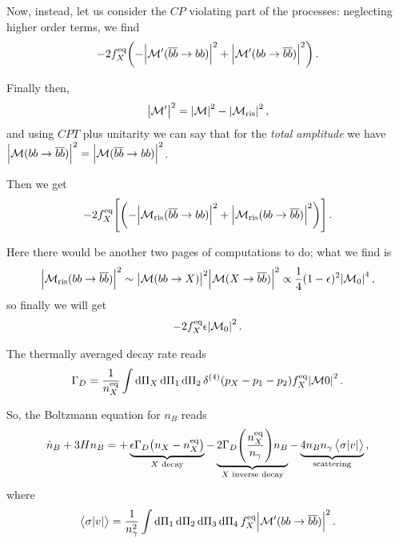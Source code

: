 \documentclass[main.tex]{subfiles}
\begin{document}
Now, instead, let us consider the \(CP\) violating part of the processes: neglecting higher order terms, we find 
%
\begin{align}
- 2 f_X^{\text{eq}} \qty(- \abs{\mathcal{M}'(\overline{b} \overline{b} \to bb)}^2 + \abs{\mathcal{M}' (bb \to \overline{b} \overline{b})}^2)
\,.
\end{align}

Finally then, 
%
\begin{align}
\abs{\mathcal{M}'}^2 = \abs{\mathcal{M}}^2 - \abs{\mathcal{M}_{\text{ris}}}^2
\,,
\end{align}
%
and using \(CPT\) plus unitarity we can say that for the \emph{total amplitude} we have \(\abs{\mathcal{M}(bb \to \overline{b}\overline{b})}^2 = \abs{\mathcal{M}(\overline{b}\overline{b} \to bb)}^2\).

Then we get 
%
\begin{align}
-2 f_X^{\text{eq}} \qty[\qty(- \abs{\mathcal{M}_{\text{ris}}(\overline{b} \overline{b} \to bb)}^2 + \abs{\mathcal{M}_{\text{ris}} (bb \to \overline{b} \overline{b})}^2)]
\,.
\end{align}

Here there would be another two pages of computations to do; what we find is 
%
\begin{align}
\abs{\mathcal{M}_{\text{ris}}(bb \to \overline{b}\overline{b})}^2
\sim 
\abs{\mathcal{M}(bb \to X)}^2
\abs{\mathcal{M}(X \to \overline{b}\overline{b})}^2
\propto \frac{1}{4} (1 - \epsilon )^2 \abs{\mathcal{M}_0}^4
\,,
\end{align}
%
so finally we will get 
%
\begin{align}
-2 f_X^{\text{eq}} \epsilon \abs{\mathcal{M}_0}^2
\,.
\end{align}

The thermally averaged decay rate reads 
%
\begin{align}
\Gamma _D = \frac{1}{n_X^{\text{eq}}} \int \dd{\Pi _X} \dd{\Pi_1 } \dd{\Pi _2} \delta^{(4)} (p_X - p_1 - p_2 ) f_X^{\text{eq}} \abs{\mathcal{M}0 }^2
\,.
\end{align}

So, the Boltzmann equation for \(n_B\) reads
%
\begin{align}
\dot{n}_B + 3 H n_B = + \underbrace{\epsilon \Gamma _D \qty(n_X - n_X^{\text{eq}})}_{X \text{ decay}}
- \underbrace{2 \Gamma _D \qty( \frac{n_X^{\text{eq}}}{n_\gamma }) n_B }_{X \text{ inverse decay}}
- \underbrace{4 n_B n_\gamma \expval{\sigma \abs{v}}}_{\text{scattering}}
\,,
\end{align}
%
where 
%
\begin{align}
\expval{\sigma \abs{v}} = \frac{1}{n_\gamma^2}
\int \dd{\Pi_1 } \dd{\Pi_2 } \dd{\Pi_3 } \dd{\Pi_4 }
f_X^{\text{eq}} \abs{\mathcal{M}' (bb \to \overline{b}\overline{b})}^2
\,.
\end{align}
\end{document}
